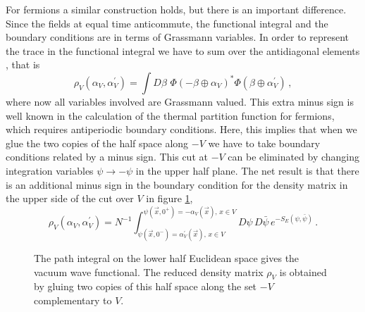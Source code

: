 \documentclass[11pt]{article}
\begin{document}
For fermions a similar construction holds, but there is an important difference. Since the fields at equal time anticommute, the functional integral and the boundary conditions are in terms of  Grassmann variables. In order to represent the trace in the functional integral we have to sum over the antidiagonal elements \cite{klein}, that is  
\begin{equation}
\rho_V(\alpha_{V},\alpha^\prime_{V})=\int D\beta\,\, \Phi(-\beta \oplus \alpha_{V})^* \Phi(\beta\oplus \alpha^\prime_{V})\,,
\end{equation}
where now all variables involved are Grassmann valued. This extra minus sign is well known in the calculation of the thermal partition function for fermions, which requires antiperiodic boundary conditions.  Here, this implies that when we glue the two copies of the half space along $-V$ we have to take boundary conditions related by a minus sign. This cut at $-V$ can be eliminated by changing integration variables $\psi\rightarrow -\psi$ in the upper half plane. The net result is that there is an additional minus sign in the boundary condition for the density matrix in the upper side of the cut over $V$ in figure \ref{figu1},  
\begin{equation}
\rho_V(\alpha_{V},\alpha^\prime_{V})=N^{-1}\int_{\psi(\vec{x},0^-)= \alpha^\prime_V(\vec{x}),\, x\in V }^{\psi(\vec{x},0^+)=-\alpha_V(\vec{x}),\,x\in V} D\psi\,D\bar{\psi}\, e^{-S_E(\psi,\bar{\psi})}\,. 
\end{equation}

\begin{figure} [tbp]
\centering
\leavevmode
\epsfysize=4cm
\bigskip
{}
\caption{The path integral on the lower half Euclidean space gives the vacuum wave functional. The reduced density matrix $\rho_V$ is obtained by gluing two copies of this half space along the set $-V$ complementary to $V$.}
\label{figu1}
\end{figure}
\end{document}
